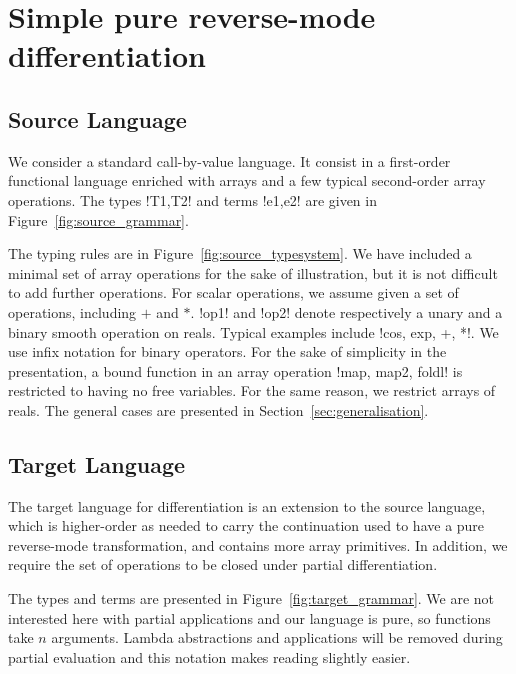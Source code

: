 \section{Simple pure reverse-mode differentiation}
\label{sec:simplediff}

\subsection{Source Language} 

We consider a standard call-by-value language. 
It consist in a first-order functional language enriched with arrays and a few typical second-order array operations. 
The types !T1,T2! and terms !e1,e2! are given in Figure~\ref{fig:source_grammar}.



The typing rules are in Figure~\ref{fig:source_typesystem}. We have included a minimal set of array operations for the sake of illustration, 
but it is not difficult to add further operations. 
For scalar operations, we assume given a set of operations, including $+$ and $*$. 
!op1! and !op2! denote respectively a unary and a binary smooth operation on reals. 
Typical examples include !cos, exp, +, *!. 
We use infix notation for binary operators.
For the sake of simplicity in the presentation, a bound function in an array operation !map, map2, foldl! is restricted to having no free variables.
For the same reason, we restrict arrays of reals.
The general cases are presented in Section~\ref{sec:generalisation}.



\subsection{Target Language}

The target language for differentiation is an extension to the source language, 
which is higher-order as needed to carry the continuation used to have a pure reverse-mode transformation, 
and contains more array primitives. In addition, we require the set of operations to be closed under partial differentiation. 

The types and terms are presented in Figure~\ref{fig:target_grammar}.
We are not interested here with partial applications and our language is pure, so functions take $n$ arguments.
Lambda abstractions and applications will be removed during partial evaluation and this notation makes reading slightly easier.

